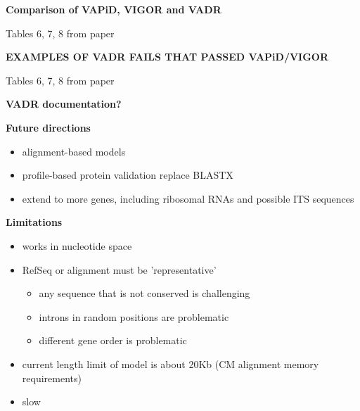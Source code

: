 \documentclass[landscape]{slides}
\begin{document}
\begin{slide}
\begin{center}
\textbf{Comparison of VAPiD, VIGOR and VADR}
\end{center}

Tables 6, 7, 8 from paper

\vfill
\end{slide}
\begin{slide}
\begin{center}
\textbf{EXAMPLES OF VADR FAILS THAT PASSED VAPiD/VIGOR}
\end{center}

Tables 6, 7, 8 from paper

\vfill
\end{slide}
\begin{slide}
\begin{center}
\textbf{VADR documentation?}
\end{center}

\vfill
\end{slide}
\begin{slide}
\begin{center}
\textbf{Future directions}
\end{center}

\begin{itemize}
\item alignment-based models 
\item profile-based protein validation replace BLASTX
\item extend to more genes, including ribosomal RNAs and possible ITS
  sequences 
\end{itemize}

\vfill
\end{slide}
\begin{slide}
\begin{center}
\textbf{Limitations}
\end{center}

\begin{itemize}
\item works in nucleotide space
\item RefSeq or alignment must be 'representative'
  \begin{itemize}
    \item any sequence that is not conserved is challenging
    \item introns in random positions are problematic
    \item different gene order is problematic
  \end{itemize}
\item current length limit of model is about 20Kb (CM alignment memory
  requirements)
\item slow
\end{itemize}

\vfill
\end{slide}
\end{document}
